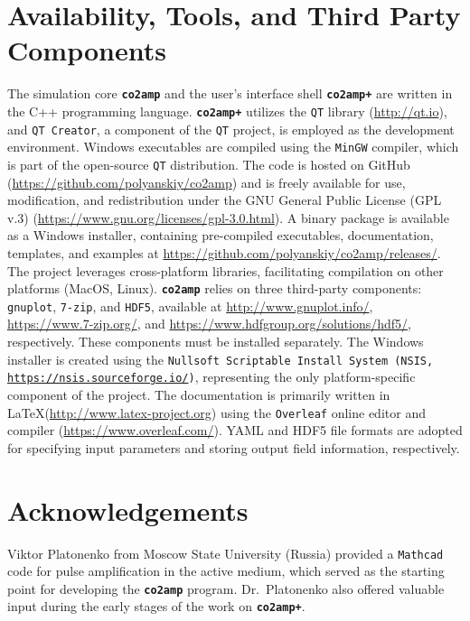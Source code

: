 \section{Availability, Tools, and Third Party Components}
The simulation core \textbf{\texttt{co2amp}} and the user's interface shell \textbf{\texttt{co2amp+}} are written in the C++ programming language. \textbf{\texttt{co2amp+}} utilizes the \texttt{QT} library (\url{http://qt.io}), and \texttt{QT Creator}, a component of the \texttt{QT} project, is employed as the development environment. Windows executables are compiled using the \texttt{MinGW} compiler, which is part of the open-source \texttt{QT} distribution. The code is hosted on GitHub (\url{https://github.com/polyanskiy/co2amp}) and is freely available for use, modification, and redistribution under the GNU General Public License (GPL v.3) (\url{https://www.gnu.org/licenses/gpl-3.0.html}). A binary package is available as a Windows installer, containing pre-compiled executables, documentation, templates, and examples at \url{https://github.com/polyanskiy/co2amp/releases/}. The project leverages cross-platform libraries, facilitating compilation on other platforms (MacOS, Linux). \textbf{\texttt{co2amp}} relies on three third-party components: \texttt{gnuplot}, \texttt{7-zip}, and \texttt{HDF5}, available at \url{http://www.gnuplot.info/}, \url{https://www.7-zip.org/}, and \url{https://www.hdfgroup.org/solutions/hdf5/}, respectively. These components must be installed separately. The Windows installer is created using the \texttt{Nullsoft Scriptable Install System (NSIS, \url{https://nsis.sourceforge.io/})}, representing the only platform-specific component of the project. The documentation is primarily written in \LaTeX (\url{http://www.latex-project.org}) using the \texttt{Overleaf} online editor and compiler (\url{https://www.overleaf.com/}). YAML and HDF5 file formats are adopted for specifying input parameters and storing output field information, respectively.



\section{Acknowledgements}
Viktor Platonenko from Moscow State University (Russia) provided a \texttt{Mathcad} code for pulse amplification in the  active medium, which served as the starting point for developing the \textbf{\texttt{co2amp}} program. Dr.~Platonenko also offered valuable input during the early stages of the work on \textbf{\texttt{co2amp+}}.
